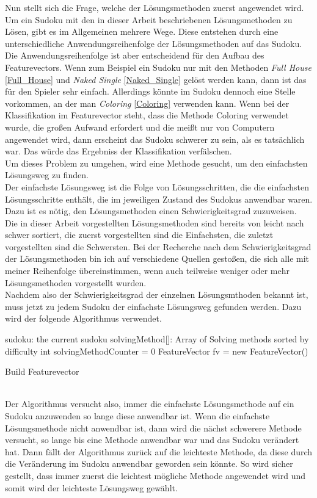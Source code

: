 Nun stellt sich die Frage, welche der Lösungsmethoden zuerst angewendet wird. Um ein Sudoku mit den in dieser Arbeit beschriebenen Lösungsmethoden zu Lösen, gibt es im Allgemeinen mehrere Wege. Diese entstehen durch eine unterschiedliche Anwendungsreihenfolge der Lösungsmethoden auf das Sudoku. Die Anwendungsreihenfolge ist aber entscheidend für den Aufbau des Featurevectors. Wenn zum Beispiel ein Sudoku nur mit den Methoden \textit{Full House} \ref{Full_House} und \textit{Naked Single} \ref{Naked_Single} gelöst werden kann, dann ist das für den Spieler sehr einfach. Allerdings könnte im Sudoku dennoch eine Stelle vorkommen, an der man \textit{Coloring} \ref{Coloring} verwenden kann. Wenn bei der Klassifikation im Featurevector steht, dass die Methode Coloring verwendet wurde, die großen Aufwand erfordert und die meißt nur von Computern angewendet wird, dann erscheint das Sudoku schwerer zu sein, als es tatsächlich war. Das würde das Ergebniss der Klassifikation verfälschen.\\
Um dieses Problem zu umgehen, wird eine Methode gesucht, um den einfachsten Lösungsweg zu finden.\\
Der einfachste Lösungsweg ist die Folge von Lösungsschritten, die die einfachsten Lösungsschritte enthält, die im jeweiligen Zustand des Sudokus anwendbar waren. Dazu ist es nötig, den Lösungsmethoden einen Schwierigkeitsgrad zuzuweisen. \\
Die in dieser Arbeit vorgestellten Lösungsmethoden sind bereits von leicht nach schwer sortiert, die zuerst vorgestellten sind die Einfachsten, die zuletzt vorgestellten sind die Schwersten. Bei der Recherche nach dem Schwierigkeitsgrad der Lösungsmethoden bin ich auf verschiedene Quellen gestoßen, die sich alle mit meiner Reihenfolge übereinstimmen, wenn auch teilweise weniger oder mehr Lösungsmethoden vorgestellt wurden.\\
Nachdem also der Schwierigkeitsgrad der einzelnen Lösungsmthoden bekannt ist, muss jetzt zu jedem Sudoku der einfachste Lösungsweg gefunden werden. Dazu wird der folgende Algorithmus verwendet.\\

\begin{algorithm}[H]
 sudoku: the current sudoku\;
 solvingMethod[]: Array of Solving methods sorted by difficulty\;
 int solvingMethodCounter = 0\;
 FeatureVector fv = new FeatureVector()\;
 \caption{Build Featurevector}
\end{algorithm}
\mbox{} \\
Der Algorithmus versucht also, immer die einfachste Lösungsmethode auf ein Sudoku anzuwenden so lange diese anwendbar ist. Wenn die einfachste Lösungsmethode nicht anwendbar ist, dann wird die nächst schwerere Methode versucht, so lange bis eine Methode anwendbar war und das Sudoku verändert hat. Dann fällt der Algorithmus zurück auf die leichteste Methode, da diese durch die Veränderung im Sudoku anwendbar geworden sein könnte. So wird sicher gestellt, dass immer zuerst die leichtest mögliche Methode angewendet wird und somit wird der leichteste Lösungsweg gewählt.